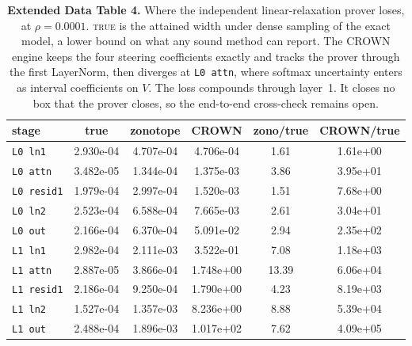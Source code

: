 \documentclass[sn-nature,pdflatex]{sn-jnl}
\begin{document}
\begin{table}[t]
\centering
\caption*{\textbf{Extended Data Table 4.} Where the independent linear-relaxation prover loses, at $\rho=\num{0.0001}$. \textsc{true} is the attained width under dense sampling of the exact model, a lower bound on what any sound method can report. The CROWN engine keeps the four steering coefficients exactly and tracks the prover through the first LayerNorm, then diverges at \texttt{L0 attn}, where softmax uncertainty enters as interval coefficients on $V$. The loss compounds through layer~1. It closes no box that the prover closes, so the end-to-end cross-check remains open.}
\label{edtab:crown}
\begin{tabular}{l S[table-format=1.3e2] S[table-format=1.3e2] S[table-format=1.3e2] S[table-format=2.2] S[table-format=1.2e2]}
\toprule
stage & {true} & {zonotope} & {CROWN} & {zono/true} & {CROWN/true} \\
\midrule
\texttt{L0 ln1} & 2.930e-04 & 4.707e-04 & 4.706e-04 & 1.61 & 1.61e+00 \\
\texttt{L0 attn} & 3.482e-05 & 1.344e-04 & 1.375e-03 & 3.86 & 3.95e+01 \\
\texttt{L0 resid1} & 1.979e-04 & 2.997e-04 & 1.520e-03 & 1.51 & 7.68e+00 \\
\texttt{L0 ln2} & 2.523e-04 & 6.588e-04 & 7.665e-03 & 2.61 & 3.04e+01 \\
\texttt{L0 out} & 2.166e-04 & 6.370e-04 & 5.091e-02 & 2.94 & 2.35e+02 \\
\texttt{L1 ln1} & 2.982e-04 & 2.111e-03 & 3.522e-01 & 7.08 & 1.18e+03 \\
\texttt{L1 attn} & 2.887e-05 & 3.866e-04 & 1.748e+00 & 13.39 & 6.06e+04 \\
\texttt{L1 resid1} & 2.186e-04 & 9.250e-04 & 1.790e+00 & 4.23 & 8.19e+03 \\
\texttt{L1 ln2} & 1.527e-04 & 1.357e-03 & 8.236e+00 & 8.88 & 5.39e+04 \\
\texttt{L1 out} & 2.488e-04 & 1.896e-03 & 1.017e+02 & 7.62 & 4.09e+05 \\
\bottomrule
\end{tabular}
\end{table}
\end{document}
